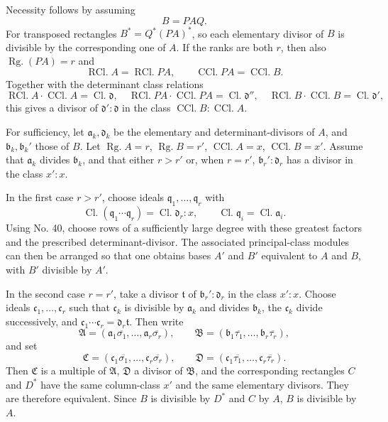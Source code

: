 \documentclass[11pt]{article}
\newcommand{\Rg}{\operatorname{Rg.}}
\newcommand{\Kl}{\operatorname{Cl.}}
\newcommand{\Zkl}{\operatorname{RCl.}}
\newcommand{\Kkl}{\operatorname{CCl.}}
\begin{document}
Necessity follows by assuming
\begin{equation}
B=PAQ.
\tag{82}
\end{equation}
For transposed rectangles $B^*=Q^*(PA)^*$, so each elementary divisor of $B$ is divisible by the corresponding one of $A$. If the ranks are both $r$, then also $\Rg(PA)=r$ and
\begin{equation}
\Zkl A=\Zkl PA,
\qquad
\Kkl PA=\Kkl B.
\tag{83}
\end{equation}
Together with the determinant class relations
\begin{equation}
\Zkl A\cdot\Kkl A=\Kl\mathfrak d,
\quad
\Zkl PA\cdot\Kkl PA=\Kl\mathfrak d'',
\quad
\Zkl B\cdot\Kkl B=\Kl\mathfrak d',
\tag{84}
\end{equation}
this gives a divisor of $\mathfrak d':\mathfrak d$ in the class $\Kkl B:\Kkl A$.

For sufficiency, let $\mathfrak a_k,
\mathfrak d_k$ be the elementary and determinant-divisors of $A$, and $\mathfrak b_k,
\mathfrak b_k'$ those of $B$. Let $\Rg A=r$, $\Rg B=r'$, $\Kkl A=x$, $\Kkl B=x'$. Assume that $\mathfrak a_k$ divides $\mathfrak b_k$, and that either $r>r'$ or, when $r=r'$, $\mathfrak b_r':\mathfrak d_r$ has a divisor in the class $x':x$.

In the first case $r>r'$, choose ideals $\mathfrak q_1,
\ldots,
\mathfrak q_r$ with
\begin{equation}
\Kl(\mathfrak q_1\cdots\mathfrak q_r)=\Kl\mathfrak d_r:x,
\qquad
\Kl\mathfrak q_i=\Kl\mathfrak a_i.
\tag{85}
\end{equation}
Using No. 40, choose rows of a sufficiently large degree with these greatest factors and the prescribed determinant-divisor. The associated principal-class modules can then be arranged so that one obtains bases $A'$ and $B'$ equivalent to $A$ and $B$, with $B'$ divisible by $A'$.

In the second case $r=r'$, take a divisor $\mathfrak t$ of $\mathfrak b_r':\mathfrak d_r$ in the class $x':x$. Choose ideals $\mathfrak c_1,
\ldots,
\mathfrak c_r$ such that $\mathfrak c_k$ is divisible by $\mathfrak a_k$ and divides $\mathfrak b_k$, the $\mathfrak c_k$ divide successively, and $\mathfrak c_1\cdots\mathfrak c_r=\mathfrak d_r\mathfrak t$. Then write
\[
\mathfrak A=(\mathfrak a_1\overline{\sigma_1},
\ldots,
\mathfrak a_r\overline{\sigma_r}),
\qquad
\mathfrak B=(\mathfrak b_1\overline{\tau_1},
\ldots,
\mathfrak b_r\overline{\tau_r}),
\]
and set
\[
\mathfrak C=(\mathfrak c_1\overline{\sigma_1},
\ldots,
\mathfrak c_r\overline{\sigma_r}),
\qquad
\mathfrak D=(\mathfrak c_1\overline{\tau_1},
\ldots,
\mathfrak c_r\overline{\tau_r}).
\]
Then $\mathfrak C$ is a multiple of $\mathfrak A$, $\mathfrak D$ a divisor of $\mathfrak B$, and the corresponding rectangles $C$ and $D^*$ have the same column-class $x'$ and the same elementary divisors. They are therefore equivalent. Since $B$ is divisible by $D^*$ and $C$ by $A$, $B$ is divisible by $A$.
\end{document}
